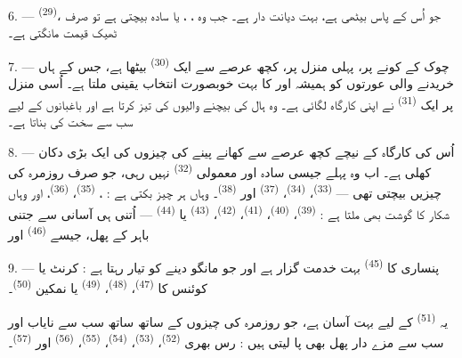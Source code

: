 \VUsaut{4.0mm}
\VUsaut{3.0mm}

6. ---  \textsuperscript{(29)}، جو اُس کے پاس بیٹھی
ہے، بہت دیانت دار ہے۔ جب وہ ، ،
 یا سادہ  بیچتی ہے تو صرف ٹھیک قیمت
مانگتی ہے۔

7. --- چوک کے کونے پر، پہلی منزل پر، کچھ عرصے سے ایک
 \textsuperscript{(30)} بیٹھا ہے، جس کے ہاں خریدنے
والی عورتوں کو ہمیشہ  
 اور  کا بہت خوبصورت انتخاب یقینی ملتا
ہے۔ اُسی منزل پر ایک  \textsuperscript{(31)} نے اپنی
کارگاہ لگائی ہے۔ وہ ہال کی بیچنے والیوں کی  تیز کرتا
ہے اور باغبانوں کے لیے سب سے سخت  کی
 بناتا ہے۔

\VUsaut{4.0mm}
\VUsaut{3.0mm}

8. --- اُس کی کارگاہ کے نیچے کچھ عرصے سے کھانے پینے کی چیزوں کی ایک
بڑی دکان کھلی ہے۔ اب وہ پہلے جیسی سادہ اور معمولی  \textsuperscript{(32)} نہیں رہی، جو صرف روزمرہ کی چیزیں بیچتی
تھی —  \textsuperscript{(33)}، 
\textsuperscript{(34)}،  \textsuperscript{(37)}
اور  \textsuperscript{(38)}۔ وہاں ہر چیز بکتی ہے :
،  \textsuperscript{(35)}،
 \textsuperscript{(36)}، 
   اور
 وہاں شکار کا گوشت بھی ملتا ہے :
 \textsuperscript{(39)}، 
\textsuperscript{(40)}،  \textsuperscript{(41)}،
 \textsuperscript{(42)}، 
\textsuperscript{(43)} یا  \textsuperscript{(44)} —
اُتنی ہی آسانی سے جتنی باہر کے پھل، جیسے 
\textsuperscript{(46)} اور 

9. --- پنساری کا  \textsuperscript{(45)} بہت خدمت گزار
ہے اور جو مانگو دینے کو تیار رہتا ہے : کرنٹ یا کوئنس کا
 \textsuperscript{(47)}، 
\textsuperscript{(48)}،  \textsuperscript{(49)}
یا نمکین  \textsuperscript{(50)}۔

یہ  \textsuperscript{(51)} کے لیے بہت آسان ہے، جو
روزمرہ کی چیزوں کے ساتھ ساتھ سب سے نایاب  اور سب
سے مزے دار پھل بھی پا لیتی ہیں : رس بھری 
\textsuperscript{(52)}،  \textsuperscript{(53)}،
 \textsuperscript{(54)}، 
\textsuperscript{(55)}،  \textsuperscript{(56)} اور
 \textsuperscript{(57)}۔


